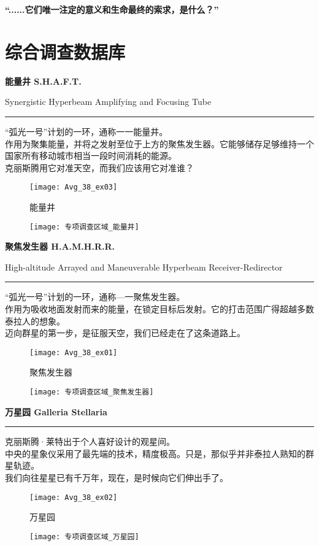 \documentclass[openany]{book}
\begin{document}
\begin{center} \textbf{“......它们唯一注定的意义和生命最终的索求，是什么？”}\end{center} \par

\chapter{综合调查数据库}
\textbf{能量井 S.H.A.F.T.}\par
Synergistic Hyperbeam Amplifying and Focusing Tube \par\noindent\rule{\textwidth}{0.4pt}
“弧光一号”计划的一环，通称一一能量井。\\
作用为聚集能量，并将之发射至位于上方的聚焦发生器。它能够储存足够维持一个国家所有移动城市相当一段时间消耗的能源。\\
克丽斯腾用它对准天空，而我们应该用它对准谁？
\begin{figure}[h]
    \caption*{能量井}
    \centering
    \texttt{[image: Avg\_38\_ex03]}
\end{figure}
\begin{figure}[h]
    \centering
    \texttt{[image: 专项调查区域\_能量井]}
\end{figure}

\textbf{聚焦发生器 H.A.M.H.R.R.}\par
High-altitude Arrayed and Maneuverable Hyperbeam Receiver-Redirector \par\noindent\rule{\textwidth}{0.4pt}
“弧光一号”计划的一环，通称—一聚焦发生器。\\
作用为吸收地面发射而来的能量，在锁定目标后发射。它的打击范围广得超越多数泰拉人的想象。\\
迈向群星的第一步，是征服天空，我们已经走在了这条道路上。
\begin{figure}[h]
    \caption*{聚焦发生器}
    \centering
    \texttt{[image: Avg\_38\_ex01]}
\end{figure}
\begin{figure}[h]
    \centering
    \texttt{[image: 专项调查区域\_聚焦发生器]}
\end{figure}

\textbf{万星园 Galleria Stellaria}\par\noindent\rule{\textwidth}{0.4pt}
克丽斯腾·莱特出于个人喜好设计的观星间。\\
中央的星象仪采用了最先端的技术，精度极高。只是，那似乎并非泰拉人熟知的群星轨迹。\\
我们向往星星已有千万年，现在，是时候向它们伸出手了。
\begin{figure}[h]
    \caption*{万星园}
    \centering
    \texttt{[image: Avg\_38\_ex02]}
\end{figure}
\begin{figure}[h]
    \centering
    \texttt{[image: 专项调查区域\_万星园]}
\end{figure}
\end{document}
